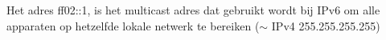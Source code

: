 Het adres ff02::1, is het multicast adres dat gebruikt wordt bij IPv6 om alle apparaten op hetzelfde lokale netwerk te bereiken ($\sim$ IPv4 255.255.255.255)
